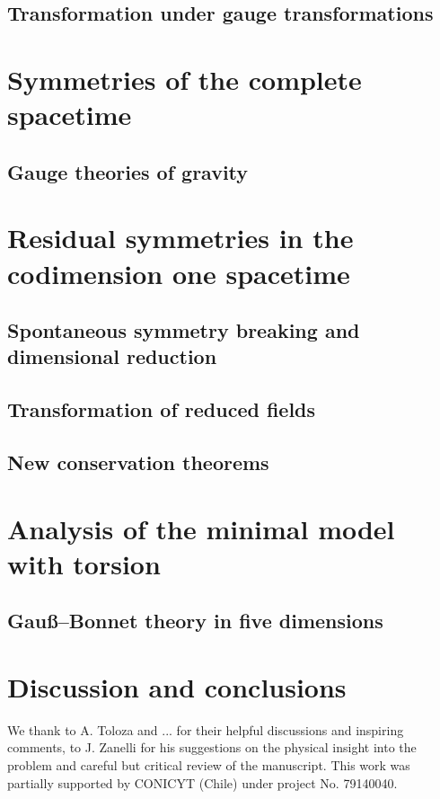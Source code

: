 \documentclass[aps,prd,12pt,superscriptaddress,showpacs,showkeys,reprint]{revtex4-1}
\begin{document}
\subsection*{Transformation under gauge transformations}

\section{Symmetries of the complete spacetime}

\subsection*{Gauge theories of gravity}

\section{Residual symmetries in the codimension one spacetime}

\subsection*{Spontaneous symmetry breaking and dimensional reduction}

\subsection*{Transformation of reduced fields}

\subsection*{New conservation theorems}

\section{Analysis of the minimal model with torsion}

\subsection*{Gau\ss--Bonnet theory in five dimensions}

\section{Discussion and conclusions}

\begin{acknowledgments}
  We thank to A. Toloza and ...  for their helpful discussions and inspiring comments, to J. Zanelli for his suggestions on the physical insight into the problem and careful but critical review of the manuscript.
  This work was partially supported by CONICYT (Chile) under project No. 79140040.
\end{acknowledgments}
\end{document}
